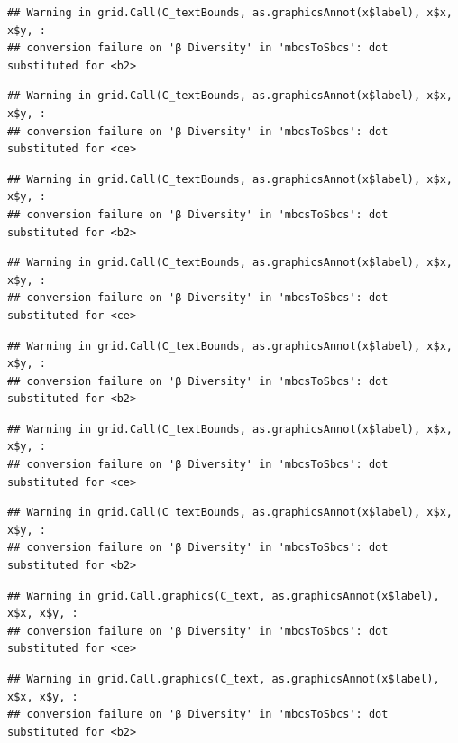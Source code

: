 \documentclass[
]{article}
\begin{document}
\begin{verbatim}
## Warning in grid.Call(C_textBounds, as.graphicsAnnot(x$label), x$x, x$y, :
## conversion failure on 'β Diversity' in 'mbcsToSbcs': dot substituted for <b2>
\end{verbatim}

\begin{verbatim}
## Warning in grid.Call(C_textBounds, as.graphicsAnnot(x$label), x$x, x$y, :
## conversion failure on 'β Diversity' in 'mbcsToSbcs': dot substituted for <ce>
\end{verbatim}

\begin{verbatim}
## Warning in grid.Call(C_textBounds, as.graphicsAnnot(x$label), x$x, x$y, :
## conversion failure on 'β Diversity' in 'mbcsToSbcs': dot substituted for <b2>
\end{verbatim}

\begin{verbatim}
## Warning in grid.Call(C_textBounds, as.graphicsAnnot(x$label), x$x, x$y, :
## conversion failure on 'β Diversity' in 'mbcsToSbcs': dot substituted for <ce>
\end{verbatim}

\begin{verbatim}
## Warning in grid.Call(C_textBounds, as.graphicsAnnot(x$label), x$x, x$y, :
## conversion failure on 'β Diversity' in 'mbcsToSbcs': dot substituted for <b2>
\end{verbatim}

\begin{verbatim}
## Warning in grid.Call(C_textBounds, as.graphicsAnnot(x$label), x$x, x$y, :
## conversion failure on 'β Diversity' in 'mbcsToSbcs': dot substituted for <ce>
\end{verbatim}

\begin{verbatim}
## Warning in grid.Call(C_textBounds, as.graphicsAnnot(x$label), x$x, x$y, :
## conversion failure on 'β Diversity' in 'mbcsToSbcs': dot substituted for <b2>
\end{verbatim}

\begin{verbatim}
## Warning in grid.Call.graphics(C_text, as.graphicsAnnot(x$label), x$x, x$y, :
## conversion failure on 'β Diversity' in 'mbcsToSbcs': dot substituted for <ce>
\end{verbatim}

\begin{verbatim}
## Warning in grid.Call.graphics(C_text, as.graphicsAnnot(x$label), x$x, x$y, :
## conversion failure on 'β Diversity' in 'mbcsToSbcs': dot substituted for <b2>
\end{verbatim}
\end{document}
